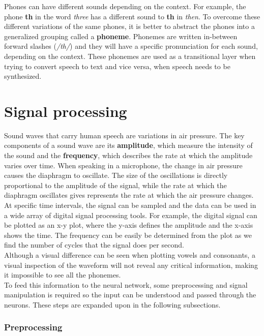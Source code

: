 Phones can have different sounds depending on the context. 
For example, the phone \textbf{th} in the word \textit{three} has a different sound to \textbf{th} in \textit{then}. 
To overcome these different variations of the same phones, 
it is better to abstract the phones into a generalized grouping called a \textbf{phoneme}.
Phonemes are written in-between forward slashes
(\textit{/th/}) and they will have a specific pronunciation for each sound, depending on the context.
These phonemes are used as a transitional layer when trying to convert speech to text and vice versa,
when speech needs to be synthesized.

\section{Signal processing}

Sound waves that carry human speech are variations in air pressure.
The key components of a sound wave are its \textbf{amplitude},
which measure the intensity of the sound and the \textbf{frequency}, which describes the rate at which the amplitude varies over time.
When speaking in a microphone,
the change in air pressure causes the diaphragm to oscillate.
The size of the oscillations is directly proportional to the amplitude of the signal,
while the rate at which the diaphragm oscillates gives represents the rate at which the air pressure changes.
At specific time intervals,
the signal can be sampled and the data can be used in a wide array of digital signal processing tools.
For example, the digital signal can be plotted as an x-y plot,
where the y-axis defines the amplitude and the x-axis shows the time.
The frequency can be easily be determined from the plot as we find the number of cycles that the signal does per second.\\

Although a visual difference can be seen when plotting vowels and consonants,
a visual inspection of the waveform will not reveal any critical information, making it impossible to see all the phonemes.\\

To feed this information to the neural network, some preprocessing and signal manipulation is required so the input can be understood and passed through the neurons.
These steps are expanded upon in the following subsections.

\subsubsection{ Preprocessing}

